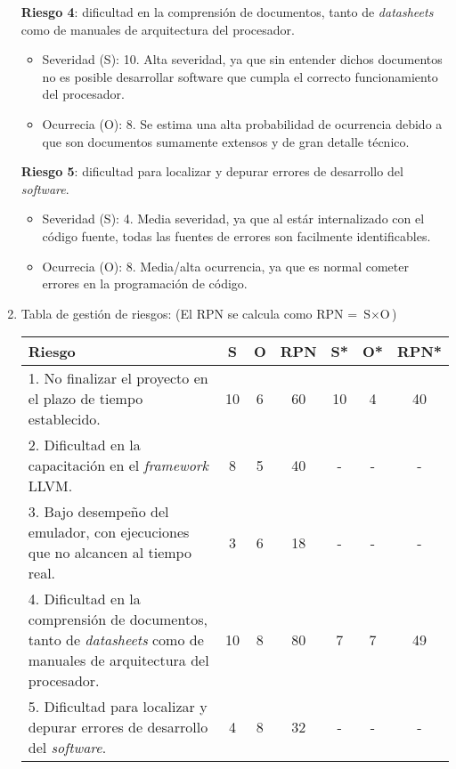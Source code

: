 \begin{enumerate}[label=\alph*)]
  \textbf{Riesgo 4}: dificultad en la comprensión de documentos, tanto de \textit{datasheets} como de manuales de arquitectura del procesador.


  \begin{itemize}
  \item Severidad (S): 10. Alta severidad, ya que sin entender dichos documentos no es posible desarrollar software que cumpla el correcto funcionamiento del procesador.
  \item Ocurrecia (O): 8. Se estima una alta probabilidad de ocurrencia debido a que son documentos sumamente extensos y de gran detalle técnico.
  \end{itemize}

  \textbf{Riesgo 5}: dificultad para localizar y depurar errores de desarrollo del \textit{software}.


  \begin{itemize}
  \item Severidad (S): 4. Media severidad, ya que al estár internalizado con el código fuente, todas las fuentes de errores son facilmente identificables.
  \item Ocurrecia (O): 8. Media/alta ocurrencia, ya que es normal cometer errores en la programación de código.
  \end{itemize}


\item Tabla de gestión de riesgos: (El RPN se calcula como RPN = $\text{S} \times \text{O}$)


  \begin{table}[htpb]
    \centering
    \begin{tabularx}{\linewidth}{@{}|X|c|c|c|c|c|c|@{}}
      \hline
      \rowcolor[HTML]{C0C0C0}
      Riesgo & S & O & RPN & S* & O* & RPN* \\ \hline
      1. No finalizar el proyecto en el plazo de tiempo establecido. & 10  & 6  &  60   &  10  &  4  &   40   \\ \hline
      2. Dificultad en la capacitación en el \textit{framework} LLVM. & 8  & 5  &  40   &  -  &  -  &   -   \\ \hline
      3. Bajo desempeño del emulador, con ejecuciones que no alcancen al tiempo real. &  3 & 6  &  18   &  -  &  -  &   -   \\ \hline
      4. Dificultad en la comprensión de documentos, tanto de \textit{datasheets} como de manuales de arquitectura del procesador. & 10  & 8  &  80   &  7  &  7  &  49    \\ \hline
      5. Dificultad para localizar y depurar errores de desarrollo del \textit{software}. &  4 & 8  &  32   &  -  & -  &   -   \\ \hline
    \end{tabularx}
  \end{table}


\end{enumerate}
